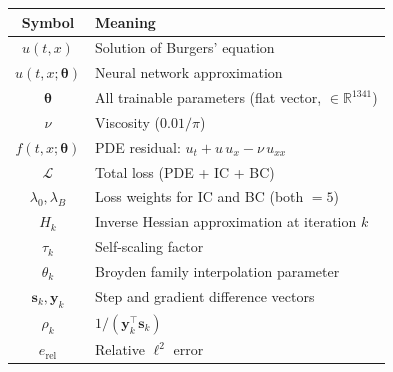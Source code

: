\documentclass[11pt,a4paper]{article}
\begin{document}
\begin{center}
\renewcommand{\arraystretch}{1.3}
\begin{tabular}{@{}cl@{}}
\toprule
\textbf{Symbol} & \textbf{Meaning} \\
\midrule
$u(t,x)$          & Solution of Burgers' equation \\
$\hat{u}(t,x;\bm\theta)$ & Neural network approximation \\
$\bm\theta$        & All trainable parameters (flat vector, $\in\mathbb{R}^{1341}$) \\
$\nu$              & Viscosity ($0.01/\pi$) \\
$f(t,x;\bm\theta)$ & PDE residual: $u_t + u\,u_x - \nu\,u_{xx}$ \\
$\mathcal{L}$      & Total loss (PDE + IC + BC) \\
$\lambda_0, \lambda_B$ & Loss weights for IC and BC (both $= 5$) \\
$H_k$              & Inverse Hessian approximation at iteration $k$ \\
$\tau_k$           & Self-scaling factor \\
$\theta_k$         & Broyden family interpolation parameter \\
$\bm{s}_k, \bm{y}_k$ & Step and gradient difference vectors \\
$\rho_k$           & $1 / (\bm{y}_k^\top \bm{s}_k)$ \\
$e_{\mathrm{rel}}$ & Relative $\ell^2$ error \\
\bottomrule
\end{tabular}
\end{center}
\end{document}
